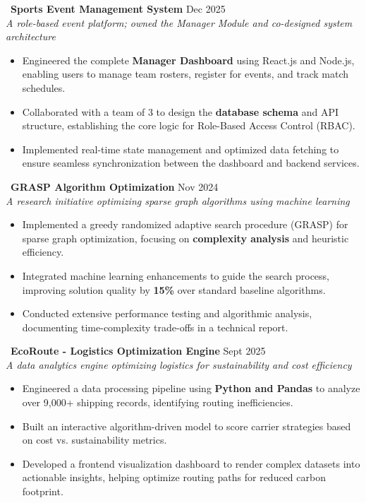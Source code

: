\documentclass[a4paper,10pt]{article}
\begin{document}
\noindent\
{\textbf{Sports Event Management System}} \href{https://github.com/SportsAmigo/SportsAmigo}{\small\faExternalLink*} \hfill Dec 2025 \\
\textit{A role-based event platform; owned the Manager Module and co-designed system architecture}
\begin{itemize}
    \item Engineered the complete \textbf{Manager Dashboard} using React.js and Node.js, enabling users to manage team rosters, register for events, and track match schedules.
    \item Collaborated with a team of 3 to design the \textbf{database schema} and API structure, establishing the core logic for Role-Based Access Control (RBAC).
    \item Implemented real-time state management and optimized data fetching to ensure seamless synchronization between the dashboard and backend services.
\end{itemize}

\vspace{4pt}
\noindent\
{\textbf{GRASP Algorithm Optimization}} \href{https://github.com/doniljaison/ai-project}{\small\faExternalLink*} \hfill Nov 2024 \\
\textit{A research initiative optimizing sparse graph algorithms using machine learning}
\begin{itemize}
    \item Implemented a greedy randomized adaptive search procedure (GRASP) for sparse graph optimization, focusing on \textbf{complexity analysis} and heuristic efficiency.
    \item Integrated machine learning enhancements to guide the search process, improving solution quality by \textbf{15\%} over standard baseline algorithms.
    \item Conducted extensive performance testing and algorithmic analysis, documenting time-complexity trade-offs in a technical report.
\end{itemize}

\vspace{4pt}
\noindent\
{\textbf{EcoRoute - Logistics Optimization Engine}} \href{https://doniljaison.github.io/ecoroute-optimizer/}{\small\faExternalLink*} \hfill Sept 2025 \\
\textit{A data analytics engine optimizing logistics for sustainability and cost efficiency}
\begin{itemize}
    \item Engineered a data processing pipeline using \textbf{Python and Pandas} to analyze over 9,000+ shipping records, identifying routing inefficiencies.
    \item Built an interactive algorithm-driven model to score carrier strategies based on cost vs. sustainability metrics.
    \item Developed a frontend visualization dashboard to render complex datasets into actionable insights, helping optimize routing paths for reduced carbon footprint.
\end{itemize}
\end{document}
